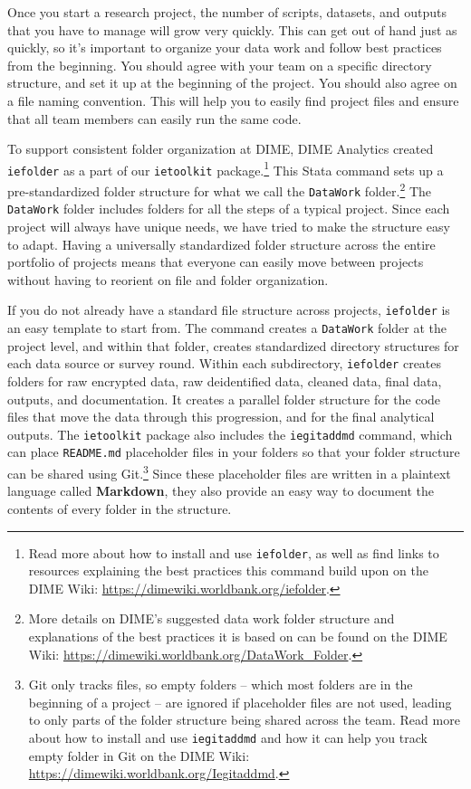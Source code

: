 \documentclass[
]{book}
\begin{document}
Once you start a research project,
the number of scripts, datasets, and outputs
that you have to manage will grow very quickly.
This can get out of hand just as quickly,
so it's important to organize your data work
and follow best practices from the beginning.
You should agree with your team on a specific directory structure,
and set it up at the beginning of the project.
You should also agree on a file naming convention.
This will help you to easily find project files and
ensure that all team members can easily run the same code.

To support consistent folder organization at DIME,
DIME Analytics created \texttt{iefolder}
as a part of our \texttt{ietoolkit} package.\footnote{Read more about how to install and use \texttt{iefolder},
  as well as find links to resources explaining
  the best practices this command build upon on the DIME Wiki:
  \url{https://dimewiki.worldbank.org/iefolder}.}
This Stata command sets up a pre-standardized folder structure
for what we call the \texttt{DataWork} folder.\footnote{More details on DIME's suggested data work folder structure
  and explanations of the best practices it is based on
  can be found on the DIME Wiki:
  \url{https://dimewiki.worldbank.org/DataWork_Folder}.}
The \texttt{DataWork} folder includes folders for all the steps of a typical project.
Since each project will always have unique needs,
we have tried to make the structure easy to adapt.
Having a universally standardized folder structure
across the entire portfolio of projects
means that everyone can easily move between projects
without having to reorient on file and folder organization.

If you do not already have a standard file structure across projects,
\texttt{iefolder} is an easy template to start from.
The command creates a \texttt{DataWork} folder at the project level,
and within that folder, creates standardized directory structures
for each data source or survey round.
Within each subdirectory, \texttt{iefolder} creates folders for raw encrypted data,
raw deidentified data, cleaned data, final data, outputs, and documentation.
It creates a parallel folder structure for the code files
that move the data through this progression,
and for the final analytical outputs.
The \texttt{ietoolkit} package also includes the \texttt{iegitaddmd} command,
which can place \texttt{README.md} placeholder files in your folders so that
your folder structure can be shared using Git.\footnote{Git only tracks files, so empty folders
  -- which most folders are in the beginning of a project --
  are ignored if placeholder files are not used,
  leading to only parts of the folder structure being shared across the team.
  Read more about how to install and use \texttt{iegitaddmd}
  and how it can help you track empty folder in Git on the DIME Wiki:
  \url{https://dimewiki.worldbank.org/Iegitaddmd}.}
Since these placeholder files are written in a plaintext language called \textbf{Markdown},
they also provide an easy way to document the contents of every folder in the structure.
\end{document}
